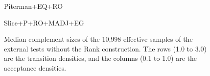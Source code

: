\makeatletter
\setlength{\@fptop}{0pt}
\makeatother

\begin{figure}[h]
  \centering
  \begin{scriptsize}
  \renewcommand{\tabcolsep}{0.05cm}
  \begin{subtable}[t]{\subwidth\textwidth}
    \centering
    
    \caption{Piterman+EQ+RO}
  \end{subtable}
  \hfill
  \begin{subtable}[t]{\subwidth\textwidth}
    \centering
    
    \caption{Slice+P+RO+MADJ+EG}
  \end{subtable}
\end{scriptsize}
\caption{Median complement sizes of the 10,998 effective samples of the external tests without the Rank construction. The rows (1.0 to 3.0) are the transition densities, and the columns (0.1 to 1.0) are the acceptance densities.}
\label{e.g.matrices}
\end{figure}



\renewcommand{\arraystretch}{1.15}
